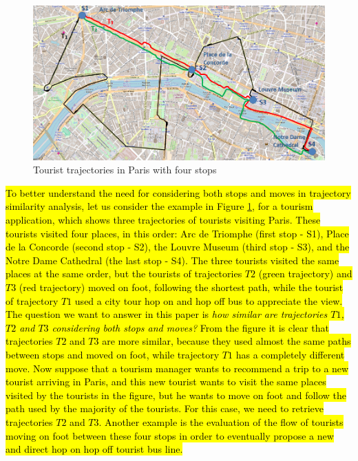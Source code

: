 \documentclass[12pt]{article}
\begin{document}
\begin{figure}[h]
\label{fig:Paris}
\centering
\includegraphics[width=1.0\textwidth]{Images/paris5.png}
\caption{Tourist trajectories in Paris with four stops}
\end{figure}


\hl{To better understand the need for considering both stops and moves in trajectory similarity analysis, let us consider the example in Figure {\ref{fig:Paris}}, for a tourism application, which shows three trajectories of tourists visiting Paris. These tourists visited four places, in this order:  Arc de Triomphe (first stop - S1), Place de la Concorde (second stop - S2), the Louvre Museum (third stop - S3), and the Notre Dame Cathedral (the last stop - S4). The three tourists visited the same places at the same order, but the tourists of trajectories $T2$ (green trajectory) and $T3$ (red trajectory) moved on foot, following the shortest path, while the tourist of trajectory $T1$ used a city tour hop on and hop off bus to appreciate the view. The question we want to answer in this paper is \emph{how similar are trajectories $T1$, $T2$ and $T3$ considering both stops and moves?} From the figure it is clear that trajectories $T2$ and $T3$ are more similar, because they used almost the same paths between stops and moved on foot, while trajectory $T1$ has a completely different move. Now suppose that a tourism manager wants to recommend a trip to a new tourist arriving in Paris, and this new tourist wants to visit the same places visited by the tourists in the figure, but he wants to move on foot and follow the path used by the majority of the tourists.
For this case, we need to retrieve trajectories $T2$ and $T3$. 
Another example is the evaluation of the flow of tourists moving on foot between these four stops in order to eventually propose a new and direct hop on hop off tourist bus line.}
\end{document}
